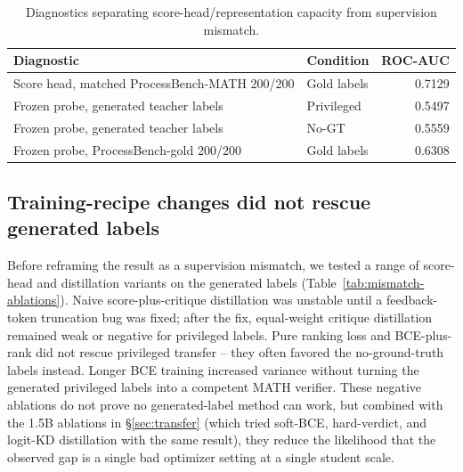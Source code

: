 \documentclass[11pt]{article}
\begin{document}
\begin{table}[t]
\centering
\small
\begin{tabular}{llr}
\toprule
Diagnostic & Condition & ROC-AUC \\
\midrule
Score head, matched ProcessBench-MATH 200/200 & Gold labels & 0.7129 \\
Frozen probe, generated teacher labels & Privileged & 0.5497 \\
Frozen probe, generated teacher labels & No-GT & 0.5559 \\
Frozen probe, ProcessBench-gold 200/200 & Gold labels & 0.6308 \\
\bottomrule
\end{tabular}
\caption{Diagnostics separating score-head/representation capacity from
supervision mismatch.}
\label{tab:mismatch-probes}
\end{table}

\subsection{Training-recipe changes did not rescue generated labels}
\label{sec:mismatch-ablations}
Before reframing the result as a supervision mismatch, we tested a range of
score-head and distillation variants on the generated labels
(Table~\ref{tab:mismatch-ablations}). Naive score-plus-critique distillation
was unstable until a feedback-token truncation bug was fixed; after the fix,
equal-weight critique distillation remained weak or negative for privileged
labels. Pure ranking loss and BCE-plus-rank did not rescue privileged
transfer -- they often favored the no-ground-truth labels instead. Longer BCE
training increased variance without turning the generated privileged labels
into a competent MATH verifier. These negative ablations do not prove no
generated-label method can work, but combined with the 1.5B ablations in
\S\ref{sec:transfer} (which tried soft-BCE, hard-verdict, and logit-KD
distillation with the same result), they reduce the likelihood that the
observed gap is a single bad optimizer setting at a single student scale.
\end{document}

